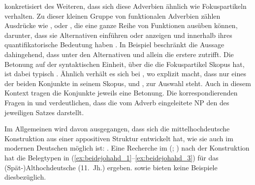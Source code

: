 \citet[425--428]{johannessen2005} konkretisiert des Weiteren, dass sich diese
Adverbien ähnlich wie Fokuspartikeln verhalten. Zu
dieser kleinen Gruppe von funktionalen Adverbien zählen Ausdrücke wie
,  oder , die eine ganze Reihe von Funktionen
ausüben können, darunter, dass sie Alternativen einführen oder anzeigen und
innerhalb ihres  quantifikatorische Bedeutung
haben \autocite[vgl.][1--4, 15]{koenig1991}. In Beispiel 
beschränkt  die Aussage dahingehend, dass unter den Alternativen
 und  allein die erstere zutrifft. Die Betonung auf der
syntaktischen Einheit, über die die Fokuspartikel Skopus hat, ist
dabei typisch \autocite[10--14]{koenig1991}. Ähnlich verhält es sich bei
, wo  explizit macht, dass nur eines der beiden
Konjunkte in seinem Skopus,  und , zur Auswahl steht. Auch in
diesem Kontext tragen die Konjunkte jeweils eine Betonung. Die
korrespondierenden Fragen in  und 
verdeutlichen, dass die vom Adverb eingeleitete NP den  des
jeweiligen Satzes darstellt.

\begin{exe}
\end{exe}

Im Allgemeinen wird davon ausgegangen, dass sich die
mittelhochdeutsche Konstruktion 
 aus einer appositiven Struktur
entwickelt hat, wie sie auch im modernen Deutschen möglich
ist:  \autocite[vgl.][626--627 und die
dortigen Referenzen]{ksw2}. Eine Recherche im  (;
\nosh\cite{ddd}) nach der Konstruktion   \autocite[vgl.][49]{schuetzeichel2012} hat die Belegtypen in
(\ref{ex:beidejohahd_1}--\ref{ex:beidejohahd_3}) für das
(Spät-)Althochdeutsche (11.~Jh.) ergeben. \citet{braune2023}
sowie \citet{schmid2023} bieten keine Beispiele dies\-bezüglich.

